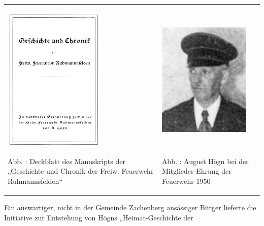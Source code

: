 \begin{center}
\begin{minipage}{10.007cm}
\begin{flushleft}
\tablefirsthead{}
\tablehead{}
\tabletail{}
\tablelasttail{}
\begin{supertabular}{m{5.0280004cm}m{4.578cm}}

\includegraphics[width=4.847cm,height=6.997cm]{pictures/zulassungsarbeit-img041.png}

Abb. : Deckblatt des Manuskripts der
„Geschichte und Chronik der Freiw. Feuerwehr Ruhmannsfelden“ &

\includegraphics[width=4.396cm,height=6.997cm]{pictures/zulassungsarbeit-img042.jpg}

Abb. : August Högn bei der Mitglieder-Ehrung
der Feuerwehr 1950\\
\end{supertabular}
\end{flushleft}
\end{minipage}
\end{center}
Ein auswärtiger, nicht in der Gemeinde Zachenberg ansässiger Bürger
lieferte die Initiative zur Entstehung von Högns „Heimat-Geschichte der
